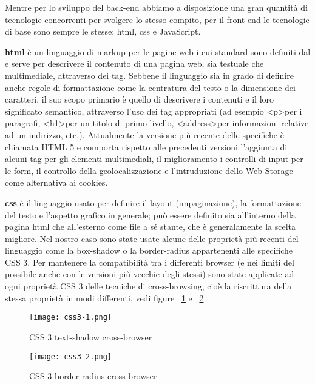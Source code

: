 Mentre per lo sviluppo del back-end abbiamo a disposizione una gran quantità di tecnologie concorrenti per svolgere lo stesso compito, per il front-end le tecnologie di base sono sempre le stesse: \Gls{html}, \Gls{css} e JavaScript.

\textbf{\Gls{html}} è un linguaggio di markup per le pagine web i cui standard sono definiti dal e serve per descrivere il contenuto di una pagina web, sia testuale che multimediale, attraverso dei tag.
Sebbene il linguaggio sia in grado di definire anche regole di formattazione come la centratura del testo o la dimensione dei caratteri, il suo scopo primario è quello di descrivere i contenuti e il loro significato semantico, attraverso l'uso dei tag appropriati (ad esempio \textless p\textgreater  per i paragrafi, \textless h1\textgreater  per un titolo di primo livello, \textless  address\textgreater  per informazioni relative ad un indirizzo, etc.).
Attualmente la versione più recente delle specifiche è chiamata HTML 5 e comporta rispetto alle precedenti versioni l'aggiunta di alcuni tag per gli elementi multimediali, il miglioramento i controlli di input per le form, il controllo della geolocalizzazione e l'intruduzione dello Web Storage come alternativa ai cookies.

\textbf{\Gls{css}}  è il linguaggio usato per definire il layout (impaginazione), la formattazione del testo e l'aspetto grafico in generale; può essere definito sia all'interno della pagina \Gls{html} che all'esterno come file a sé stante, che è generalamente la scelta migliore.
Nel nostro caso sono state usate alcune delle proprietà più recenti del linguaggio come la box-shadow o la border-radius appartenenti alle specifiche CSS 3.
Per mantenere la compatibilità tra i differenti browser (e nei limiti del possibile anche con le versioni più vecchie degli stessi) sono state applicate ad ogni proprietà CSS 3 delle tecniche di cross-browsing, cioè la riscrittura della stessa proprietà in modi differenti, vedi figure ~\ref{fig:Css3Shadow} e ~\ref{fig:Css3Radius}.

\begin{figure}[H]
    \centering
    \texttt{[image: css3-1.png]}
    \caption{CSS 3 text-shadow cross-browser}
    \label{fig:Css3Shadow}
\end{figure}

\begin{figure}[H]
    \centering
    \texttt{[image: css3-2.png]}
    \caption{CSS 3 border-radius cross-browser}
    \label{fig:Css3Radius}
\end{figure}

